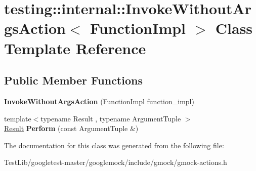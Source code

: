 \hypertarget{classtesting_1_1internal_1_1InvokeWithoutArgsAction}{}\section{testing\+:\+:internal\+:\+:Invoke\+Without\+Args\+Action$<$ Function\+Impl $>$ Class Template Reference}
\label{classtesting_1_1internal_1_1InvokeWithoutArgsAction}
\subsection*{Public Member Functions}
\begin{DoxyCompactItemize}
\item 
\mbox{\label{classtesting_1_1internal_1_1InvokeWithoutArgsAction_a05d4006d8ab70e78172bf678b1d15f18}} 
{\bfseries Invoke\+Without\+Args\+Action} (Function\+Impl function\+\_\+impl)
\item 
\mbox{\label{classtesting_1_1internal_1_1InvokeWithoutArgsAction_abdad2b7d19ff1cbd1d07a4bd585e3f4c}} 
{\footnotesize template$<$typename Result , typename Argument\+Tuple $>$ }\\\hyperlink{classResult}{Result} {\bfseries Perform} (const Argument\+Tuple \&)
\end{DoxyCompactItemize}


The documentation for this class was generated from the following file\+:\begin{DoxyCompactItemize}
\item 
Test\+Lib/googletest-\/master/googlemock/include/gmock/gmock-\/actions.\+h\end{DoxyCompactItemize}
